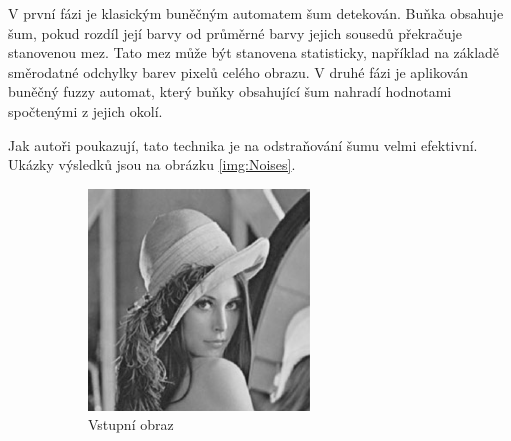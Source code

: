 \documentclass[a4paper,10pt]{article}
\begin{document}
V první fázi je klasickým buněčným automatem šum detekován. Buňka obsahuje šum, pokud rozdíl její barvy od průměrné barvy jejich sousedů překračuje stanovenou mez. Tato mez může být stanovena statisticky, například na základě směrodatné odchylky barev pixelů celého obrazu. V druhé fázi je aplikován buněčný fuzzy automat, který buňky obsahující šum nahradí hodnotami spočtenými z jejich okolí. 

Jak autoři poukazují, tato technika je na odstraňování šumu velmi efektivní. Ukázky výsledků jsou na obrázku \ref{img:Noises}. 

\begin{figure}
   \begin{subfigure}[t]{0.3\textwidth}
      \includegraphics[width=\textwidth]{noises1}
      \caption{Vstupní obraz}  
    \end{subfigure}%
%
    \begin{subfigure}[t]{0.3\textwidth}

\end{subfigure}
\end{figure}
\end{document}

